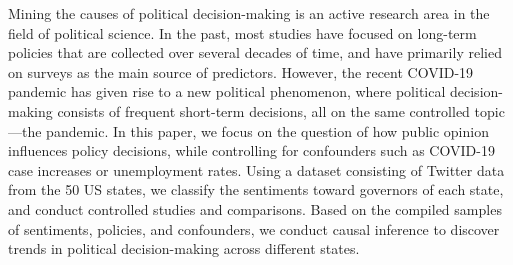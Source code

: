 Mining the causes of political decision-making is an active research area in the field of political science. In the past, most studies have focused on long-term policies that are collected over several decades of time, and have primarily relied on surveys as the main source of predictors. However, the recent COVID-19 pandemic has given rise to a new political phenomenon, where  political decision-making consists of frequent short-term decisions, all on the same controlled topic---the pandemic. In this paper, we focus on the question of how public opinion influences policy decisions, while controlling for confounders such as COVID-19 case increases or unemployment rates. Using a dataset consisting of Twitter data from the 50 US states, we classify the sentiments toward governors of each state, and conduct controlled studies and comparisons.  Based on the compiled samples of sentiments, policies, and confounders, we conduct causal inference to discover trends in political decision-making across different states.
